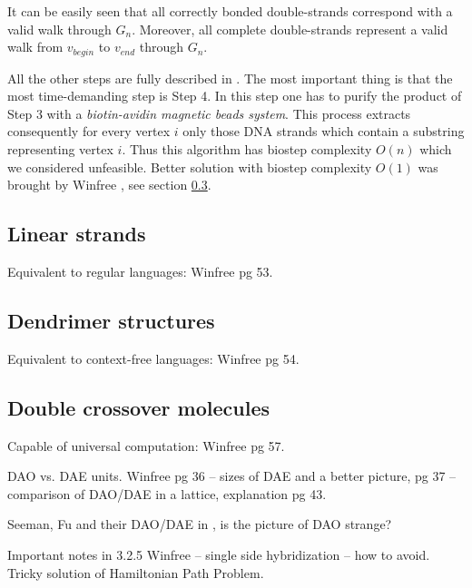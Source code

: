		It can be easily seen that all correctly bonded double-strands correspond with a valid walk through $G_n$. Moreover, all complete double-strands represent a valid walk from $v_{begin}$ to $v_{end}$ through $G_n$.
		
		All the other steps are fully described in \cite{adleman94}. The most important thing is that the most time-demanding step is Step 4. In this step one has to purify the product of Step 3 with a {\em biotin-avidin magnetic beads system}. This process extracts consequently for every vertex $i$ only those DNA strands which contain a substring representing vertex $i$. Thus this algorithm has biostep complexity $O(n)$ which we considered unfeasible. Better solution with biostep complexity $O(1)$ was brought by Winfree \cite{winfree_phd}, see section \ref{sec:double_cross}.
	
	
	
	\subsection{Linear strands}
	\label{sec:lin_strands}
		
		Equivalent to regular languages: Winfree pg 53.
	
	\subsection{Dendrimer structures}
	\label{sec:dendri}
		
		Equivalent to context-free languages: Winfree pg 54.
	
	\subsection{Double crossover molecules}
	\label{sec:double_cross}
		
		Capable of universal computation: Winfree pg 57.
		
		DAO vs. DAE units. Winfree pg 36 -- sizes of DAE and a better picture, pg 37 -- comparison of DAO/DAE in a lattice, explanation pg 43.
		
		Seeman, Fu and their DAO/DAE in \cite{seeman93}, is the picture of DAO strange?
		
		Important notes in 3.2.5 Winfree -- single side hybridization -- how to avoid. Tricky solution of Hamiltonian Path Problem.